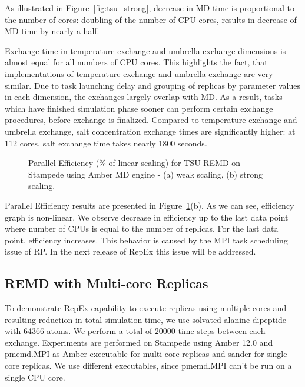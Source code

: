\documentclass{sig-alternate-05-2015}
\begin{document}
As illustrated in Figure~\ref{fig:tsu_strong}, decrease in MD time is proportional to the number of cores: doubling of the number of CPU cores, results in decrease of MD time by nearly a half.

Exchange time in temperature exchange and umbrella exchange dimensions is almost equal for all numbers of CPU cores. This highlights the fact, that implementations of temperature exchange and umbrella exchange are very similar. Due to task launching delay and grouping of replicas by parameter values in each dimension, the exchanges largely overlap with MD. As a result, tasks which have finished simulation phase sooner can perform certain exchange procedures, before exchange is finalized. Compared to temperature exchange and umbrella exchange, salt concentration exchange times are significantly higher: at 112 cores, salt exchange time takes nearly 1800 seconds.

\begin{figure}[ht!]
  \centering
  \caption{\small{Parallel Efficiency (\% of linear scaling) for TSU-REMD on Stampede using Amber MD engine - (a) weak scaling, (b) strong scaling.} 
  }
  \label{fig:p_efficiency}
\end{figure}

Parallel Efficiency results are presented in Figure~\ref{fig:p_efficiency}(b). As we can see, efficiency graph is non-linear. We observe decrease in efficiency up to the last data point where number of CPUs is equal to the number of replicas. For the last data point, efficiency increases. This behavior is caused by the MPI task scheduling issue of RP. In the next release of RepEx this issue will be addressed.   

\subsection{REMD with Multi-core Replicas} \label{exp.mcore.replicas}

To demonstrate RepEx capability to execute replicas using multiple cores and resulting reduction in total simulation time, we use solvated alanine dipeptide with 64366 atoms. We perform a total of 20000 time-steps between each exchange. Experiments are performed on Stampede using Amber 12.0 and pmemd.MPI as Amber executable for multi-core replicas and sander for single-core replicas. We use different executables, since pmemd.MPI can't be run on a single CPU core.
\end{document}
